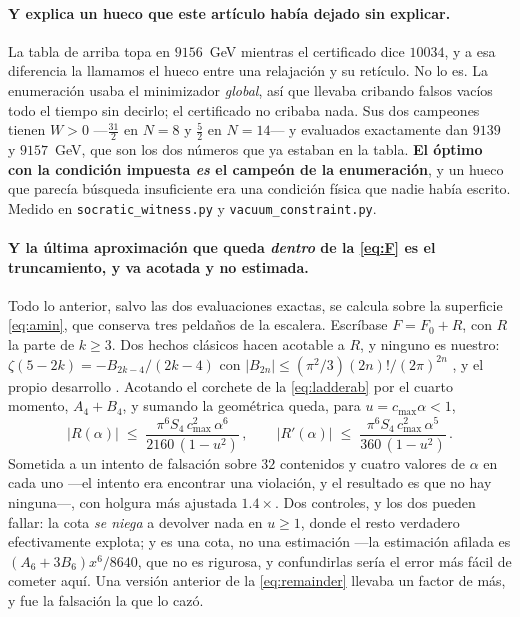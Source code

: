 \documentclass[11pt,a4paper]{article}
\begin{document}
\paragraph{Y explica un hueco que este artículo había dejado sin explicar.} La tabla de arriba topa
en $9156$~GeV mientras el certificado dice $10034$, y a esa diferencia la llamamos el hueco entre
una relajación y su retículo. No lo es. La enumeración usaba el minimizador \emph{global}, así que
llevaba cribando falsos vacíos todo el tiempo sin decirlo; el certificado no cribaba nada. Sus dos
campeones tienen $W>0$ ---$\tfrac{31}{2}$ en $N=8$ y $\tfrac52$ en $N=14$--- y evaluados exactamente dan $9139$ y
$9157$~GeV, que son los dos números que ya estaban en la tabla. \textbf{El óptimo con la condición
impuesta \emph{es} el campeón de la enumeración}, y un hueco que parecía búsqueda insuficiente era
una condición física que nadie había escrito. Medido en \texttt{socratic\_\allowbreak witness.py} y
\texttt{vacuum\_\allowbreak constraint.py}.

\paragraph{Y la última aproximación que queda \emph{dentro} de la \eqref{eq:F} es el truncamiento,
y va acotada y no estimada.}
Todo lo anterior, salvo las dos evaluaciones exactas, se calcula sobre la superficie
\eqref{eq:amin}, que conserva tres peldaños de la escalera. Escríbase $F=F_0+R$, con $R$ la parte
de $k\ge3$. Dos hechos clásicos hacen acotable a $R$, y ninguno es nuestro:
$\zeta(5-2k)=-B_{2k-4}/(2k-4)$ con $|B_{2n}|\le(\pi^2/3)(2n)!/(2\pi)^{2n}$ \cite{Apostol}, y el
propio desarrollo \cite{Lewin}. Acotando el corchete de la \eqref{eq:ladderab} por el cuarto
momento, $A_4+B_4$, y sumando la geométrica queda, para $u=c_{\max}\alpha<1$,
\begin{equation}\label{eq:remainder}
  |R(\alpha)|\;\le\;\frac{\pi^{6}S_4\,c_{\max}^{2}\,\alpha^{6}}{2160\,(1-u^{2})}\,,\qquad
  |R'(\alpha)|\;\le\;\frac{\pi^{6}S_4\,c_{\max}^{2}\,\alpha^{5}}{360\,(1-u^{2})}\,.
\end{equation}
Sometida a un intento de falsación sobre $32$ contenidos y cuatro valores de $\alpha$ en cada uno
---el intento era encontrar una violación, y el resultado es que no hay ninguna---, con holgura
más ajustada $1.4\times$. Dos controles, y los dos pueden fallar: la cota \emph{se niega} a devolver
nada en $u\ge1$, donde el resto verdadero efectivamente explota; y es una cota, no una estimación
---la estimación afilada es $(A_6+3B_6)x^6/8640$, que no es rigurosa, y confundirlas sería el error
más fácil de cometer aquí. Una versión anterior de la \eqref{eq:remainder} llevaba un factor de
más, y fue la falsación la que lo cazó.
\end{document}
